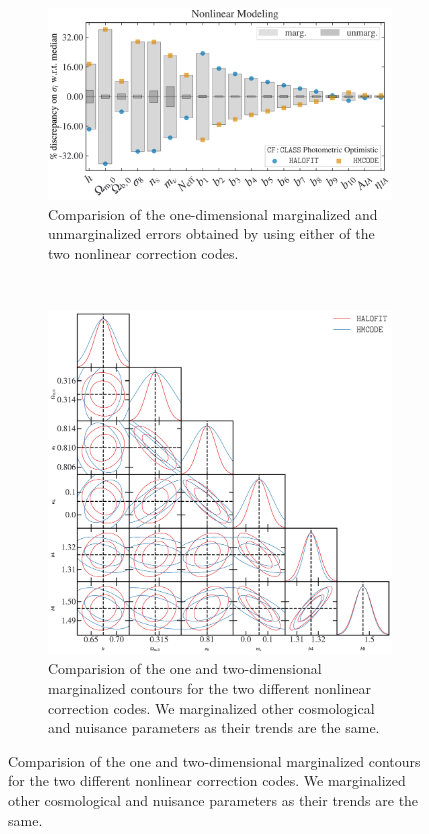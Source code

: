 \documentclass[oneside]{book}
\newcommand*{\halofit}{\texttt{HALOFIT}\xspace}
\newcommand*{\hmcode}{\texttt{HMCODE}\xspace}
\begin{document}
\begin{figure}
    \centering
    \caption{Same as figure \ref{fig:PcbVPmm} but switching the nonlinear model from \hmcode to \halofit.}
    \begin{subfigure}[b]{0.70\textwidth}
        \centering
        \includegraphics[width=\textwidth]{cosmopars_HalofitvHMcode_photo_Comparision_error_comparison.pdf}
        \caption{Comparision of the one-dimensional marginalized and unmarginalized errors obtained by using either of the two nonlinear correction codes.}
        \label{fig:dotsHCvHM}
    \end{subfigure}
    \\
    \begin{subfigure}[b]{0.70\textwidth}
        \centering
        \includegraphics[width=\textwidth]{less_HalofitvHMcode_photo_Comparision_contours.pdf}
        \caption{Comparision of the one and two-dimensional marginalized contours for the two different nonlinear correction codes. We marginalized other cosmological and nuisance parameters as their trends are the same.}
        \label{fig:triangleHCvHM}
    \end{subfigure}
       \label{fig:HCvHM} 
\end{figure}
\end{document}
